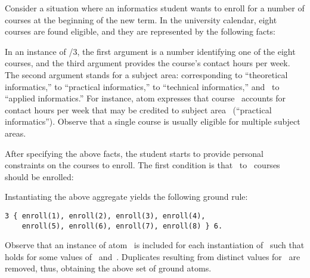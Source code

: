 \begin{example}\label{ex:aggr}
Consider a situation where an informatics student
wants to enroll for a number of courses at the beginning of the new term.
In the university calendar, eight courses are found eligible,
and they are represented by the following facts:
%

%
In an instance of /$3$,
the first argument is a number identifying one of the eight courses,
and the third argument provides the course's contact hours per week.
The second argument stands for a subject area:
 corresponding to ``theoretical informatics,''
               to ``practical informatics,''
               to ``technical informatics,''
and~               to ``applied informatics.''
For instance, atom 
expresses that course~ accounts for~ contact hours per week
that may be credited to subject area~ (``practical informatics'').
Observe that a single course is usually eligible for multiple
subject areas.

After specifying the above facts,
the student starts to provide personal constraints on the courses to enroll.
The first condition is that~ to~ courses should be enrolled:
%

%
Instantiating the above  aggregate
yields the following ground rule:%
%
\begin{lstlisting}[firstnumber=9,stepnumber=9]
3 { enroll(1), enroll(2), enroll(3), enroll(4), 
    enroll(5), enroll(6), enroll(7), enroll(8) } 6.
\end{lstlisting}
%
Observe that an instance of atom~ is included for each
instantiation of~ such that 
holds for some values of~ and~.
Duplicates resulting from distinct values for~ are removed, thus,
obtaining the above set of ground atoms.


\end{example}
